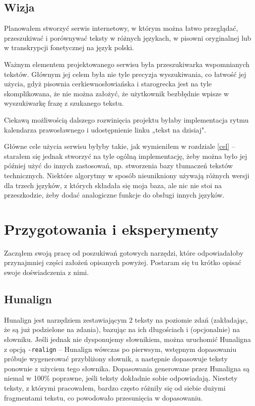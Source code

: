 \documentclass{pracamgr}
\begin{document}
\section{Wizja}\label{wizja}

Planowałem stworzyć serwis internetowy, w którym można łatwo
przeglądać, przeszukiwać i porównywać teksty w różnych językach, w
pisowni oryginalnej lub w transkrypcji fonetycznej na język polski.

Ważnym elementem projektowanego serwisu była przeszukiwarka
wspomnianych tekstów. Głównym jej celem była nie tyle precyzja
wyszukiwania, co łatwość jej użycia, gdyż pisownia cerkiewno\-{}słowiańska
i starogrecka jest na tyle skomplikowana, że nie można założyć, że
użytkownik bezbłędnie wpisze w wyszukiwarkę frazę z szukanego tekstu.

Ciekawą możliwością dalszego rozwinięcia projektu byłaby implementacja
rytmu kalendarza prawosławnego i udostępnienie linku „tekst na
dzisiaj".

Główne cele użycia serwisu byłyby takie, jak wymieniłem w rozdziale
\ref{cel} -- starałem się jednak stworzyć na tyle ogólną
implementację, żeby można było jej później użyć do innych zastosowań,
np. stworzenia bazy tłumaczeń tekstów technicznych. Niektóre algorytmy
w sposób nieunikniony używają różnych wersji dla trzech języków, z
których składała się moja baza, ale nic nie stoi na przeszkodzie, żeby
dodać analogiczne funkcje do obsługi innych języków.


\chapter{Przygotowania i eksperymenty}

Zacząłem swoją pracę od poszukiwań gotowych narzędzi, które
odpowiadałoby przynajmniej części założeń opisanych powyżej. Postaram
się tu krótko opisać swoje doświadczenia z nimi.

\section{Hunalign}

Hunalign jest narzędziem zestawiającym 2 teksty na poziomie zdań
(zakładając, że są już podzielone na zdania), bazując na ich
długościach i (opcjonalnie) na słowniku. Jeśli jednak nie dysponujemy
słownikiem, można uruchomić Hunaligna z opcją {\tt -realign} --
Hunalign wówczas po pierwsym, wstępnym dopasowaniu próbuje wygenerować
przybliżony słownik, a następnie dopasowuje teksty ponownie z użyciem
tego słownika. Dopasowania generowane przez Hunaligna są niemal w
100\% poprawne, jeśli teksty dokładnie sobie odpowiadają. Niestety
teksty, z którymi pracowałem, bardzo często różniły się od siebie
dużymi fragmentami tekstu, co powodowało przesunięcia w dopasowaniu.
\end{document}
